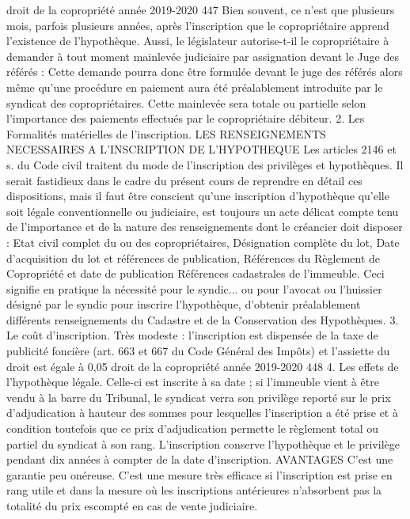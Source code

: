 droit de la copropriété année 2019-2020
447
Bien souvent, ce n'est que plusieurs mois, parfois plusieurs années, après l'inscription que le copropriétaire apprend l'existence de l'hypothèque.
Aussi, le législateur autorise-t-il le copropriétaire à demander à tout moment mainlevée judiciaire par assignation devant le Juge des référés : Cette demande pourra donc être formulée devant le juge des référés alors même qu'une procédure en paiement aura été préalablement introduite par le syndicat des copropriétaires.
Cette mainlevée sera totale ou partielle selon l'importance des paiements effectués par le copropriétaire débiteur.
2. Les Formalités matérielles de l'inscription.
LES RENSEIGNEMENTS NECESSAIRES A L’INSCRIPTION DE L’HYPOTHEQUE
Les articles 2146 et s. du Code civil traitent du mode de l'inscription des privilèges et hypothèques. Il serait fastidieux dans le cadre du présent cours de reprendre en détail ces dispositions, mais il faut être conscient qu'une inscription d'hypothèque qu'elle soit légale conventionnelle ou judiciaire, est toujours un acte délicat compte tenu de l'importance et de la nature des renseignements dont le créancier doit disposer :
Etat civil complet du ou des copropriétaires,
Désignation complète du lot,
Date d'acquisition du lot et références de publication,
Références du Règlement de Copropriété et date de publication
Références cadastrales de l'immeuble.
Ceci signifie en pratique la nécessité pour le syndic... ou pour l'avocat ou l’huissier désigné par le syndic pour inscrire l'hypothèque, d'obtenir préalablement différents renseignements du Cadastre et de la Conservation des Hypothèques.
3. Le coût d'inscription.
Très modeste : l'inscription est dispensée de la taxe de publicité foncière (art. 663 et 667 du Code Général des Impôts) et l'assiette du droit est égale à 0,05 %
droit de la copropriété année 2019-2020
448
4. Les effets de l'hypothèque légale.
Celle-ci est inscrite à sa date ; si l'immeuble vient à être vendu à la barre du Tribunal, le syndicat verra son privilège reporté sur le prix d'adjudication à hauteur des sommes pour lesquelles l'inscription a été prise et à condition toutefois que ce prix d'adjudication permette le règlement total ou partiel du syndicat à son rang.
L'inscription conserve l'hypothèque et le privilège pendant dix années à compter de la date d'inscription.
AVANTAGES
C'est une garantie peu onéreuse.
C'est une mesure très efficace si l'inscription est prise en rang utile et dans la mesure où les inscriptions antérieures n'absorbent pas la totalité du prix escompté en cas de vente judiciaire.
